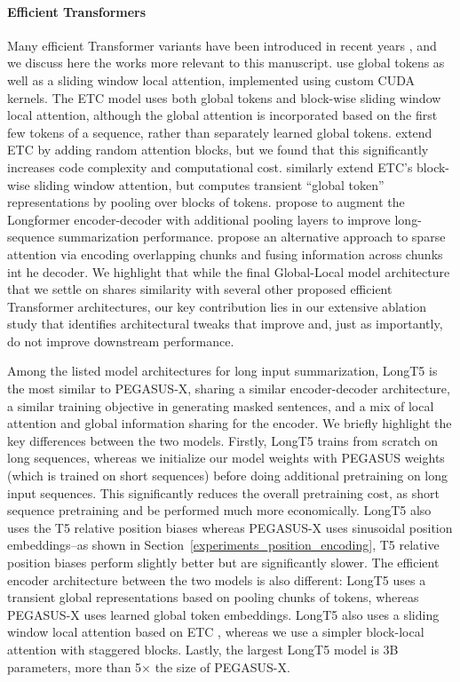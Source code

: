 \documentclass[11pt]{article}
\newcommand{\largemodel}{PEGASUS-X}
\begin{document}
\paragraph{Efficient Transformers}
Many efficient Transformer variants have been introduced in recent years \citep{tay2020efficient}, and we discuss here the works more relevant to this manuscript.
\citep{beltagy2020longformer} use global tokens as well as a sliding window local attention, implemented using custom CUDA kernels.
The ETC model \citep{ainslie2020etc} uses both global tokens and block-wise sliding window local attention, although the global attention is incorporated based on the first few tokens of a sequence, rather than separately learned global tokens.
\citet{zaheer2020bigbird} extend ETC by adding random attention blocks, but we found that this significantly increases code complexity and computational cost.
\citet{guo2021longt5} similarly extend ETC's block-wise sliding window attention, but computes transient ``global token'' representations by pooling over blocks of tokens.
\citet{pang2022topdown} propose to augment the Longformer encoder-decoder with additional pooling layers to improve long-sequence summarization performance.
\citet{ivgi2022sled} propose an alternative approach to sparse attention via encoding overlapping chunks and fusing information across chunks int he decoder.
We highlight that while the final Global-Local model architecture that we settle on shares similarity with several other proposed efficient Transformer architectures, our key contribution lies in our extensive ablation study that identifies architectural tweaks that improve and, just as importantly, do not improve downstream performance.

Among the listed model architectures for long input summarization, LongT5 \citep{guo2021longt5} is the most similar to \largemodel{}, sharing a similar encoder-decoder architecture, a similar training objective in generating masked sentences, and a mix of local attention and global information sharing for the encoder.
We briefly highlight the key differences between the two models.
Firstly, LongT5 trains from scratch on long sequences, whereas we initialize our model weights with PEGASUS weights (which is trained on short sequences) before doing additional pretraining on long input sequences.
This significantly reduces the overall pretraining cost, as short sequence pretraining and be performed much more economically.
LongT5 also uses the T5 relative position biases whereas \largemodel{} uses sinusoidal position embeddings--as shown in Section~\ref{experiments_position_encoding}, T5 relative position biases perform slightly better but are significantly slower.
The efficient encoder architecture between the two models is also different: LongT5 uses a transient global representations based on pooling chunks of tokens, whereas \largemodel{} uses learned global token embeddings.
LongT5 also uses a sliding window local attention based on ETC \citep{ainslie2020etc}, whereas we use a simpler block-local attention with staggered blocks.
Lastly, the largest LongT5 model is 3B parameters, more than 5$\times$ the size of \largemodel{}.
\end{document}
